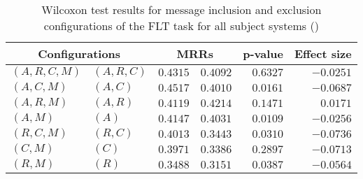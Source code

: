 
\begin{table}
\begin{spacing}{1.2}
\centering
\caption{Wilcoxon test results for message inclusion and exclusion configurations of the FLT task for all subject systems (\ctwo)}
\label{table:versus-wilcox-all-flt-message}
\begin{tabular}{ll|rr|rr}
\toprule
      \multicolumn{2}{c|}{Configurations} &                \multicolumn{2}{c|}{MRRs} &             p-value & Effect size \\
\midrule
 $(A,R,C,M)$ &  $(A,R,C)$ &  $\bm{0.4315}$ &       $0.4092$ & $0.6327$ &   $-0.0251$ \\
   $(A,C,M)$ &    $(A,C)$ &  $\bm{0.4517}$ &       $0.4010$ & $0.0161$ &   $-0.0687$ \\
   $(A,R,M)$ &    $(A,R)$ &       $0.4119$ &  $\bm{0.4214}$ & $0.1471$ &    $0.0171$ \\
     $(A,M)$ &      $(A)$ &  $\bm{0.4147}$ &       $0.4031$ & $0.0109$ &   $-0.0256$ \\
   $(R,C,M)$ &    $(R,C)$ &  $\bm{0.4013}$ &       $0.3443$ & $0.0310$ &   $-0.0736$ \\
     $(C,M)$ &      $(C)$ &  $\bm{0.3971}$ &       $0.3386$ & $0.2897$ &   $-0.0713$ \\
     $(R,M)$ &      $(R)$ &  $\bm{0.3488}$ &       $0.3151$ & $0.0387$ &   $-0.0564$ \\
\bottomrule
\end{tabular}

\end{spacing}
\end{table}


